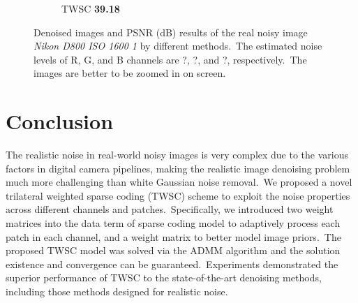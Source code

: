 \begin{figure}
\begin{subfigure}[t]{0.19\textwidth}
		\caption{TWSC \textbf{39.18}}
    \end{subfigure}
    \caption{Denoised images and PSNR (dB) results of the real noisy image \textsl{Nikon D800 ISO 1600 1} \cite{crosschannel2016} by different methods.\ The estimated noise levels of R, G, and B channels are ?, ?, and ?, respectively.\ The images are better to be zoomed in on screen.}
    \label{fig3}
\end{figure}


\section{Conclusion}

The realistic noise in real-world noisy images is very complex due to the various factors in digital camera pipelines, making the realistic image denoising problem much more challenging than white Gaussian noise removal.\ We proposed a novel trilateral weighted sparse coding (TWSC) scheme to exploit the noise properties across different channels and patches.\ Specifically, we introduced two weight matrices into the data term of sparse coding model to adaptively process each patch in each channel, and a weight matrix to better model image priors.\ The proposed TWSC model was solved via the ADMM algorithm and the solution existence and convergence can be guaranteed.\ Experiments demonstrated the superior performance of TWSC to the state-of-the-art denoising methods, including those methods designed for realistic noise.